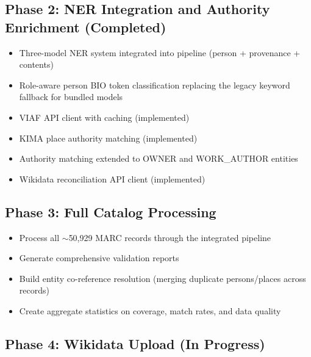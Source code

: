 \documentclass[12pt]{article}
\begin{document}
\subsection{Phase 2: NER Integration and Authority Enrichment (Completed)}

\begin{itemize}
\item Three-model NER system integrated into pipeline (person + provenance + contents)
\item Role-aware person BIO token classification replacing the legacy keyword fallback for bundled models
\item VIAF API client with caching (implemented)
\item KIMA place authority matching (implemented)
\item Authority matching extended to OWNER and WORK\_AUTHOR entities
\item Wikidata reconciliation API client (implemented)
\end{itemize}

\subsection{Phase 3: Full Catalog Processing}

\begin{itemize}
\item Process all $\sim$50,929 MARC records through the integrated pipeline
\item Generate comprehensive validation reports
\item Build entity co-reference resolution (merging duplicate persons/places across records)
\item Create aggregate statistics on coverage, match rates, and data quality
\end{itemize}

\subsection{Phase 4: Wikidata Upload (In Progress)}
\end{document}
